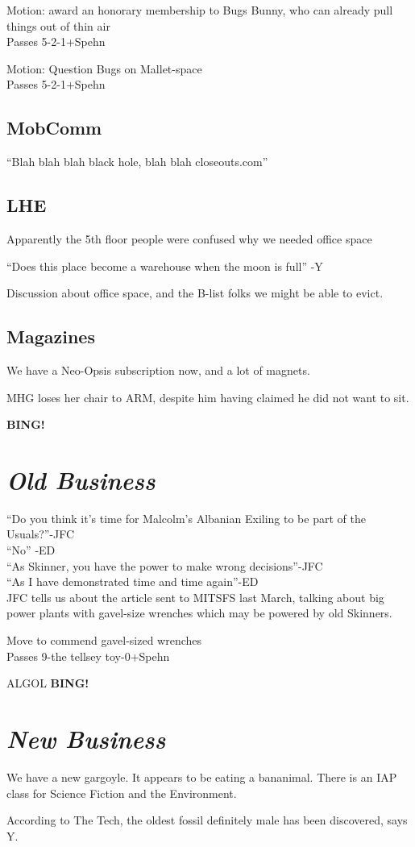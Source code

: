 \documentclass[10pt]{article}
\newcommand{\bing}{{\bf BING!} }
\newcommand{\goto}[1]{\bing \vskip 12pt \section*{{\em{#1}}}}
\begin{document}
Motion: award an honorary membership to Bugs Bunny, who can already
pull things out of thin air\\
Passes 5-2-1+Spehn

Motion: Question Bugs on Mallet-space\\
Passes 5-2-1+Spehn

\subsection*{MobComm}
``Blah blah blah black hole, blah blah closeouts.com''

\subsection*{LHE}
Apparently the 5th floor people were confused why we needed office space

``Does this place become a warehouse when the moon is full'' -Y

Discussion about office space, and the B-list folks we might be able
to evict.

\subsection*{Magazines}
We have a Neo-Opsis subscription now, and a lot of magnets.

MHG loses her chair to ARM, despite him having claimed he did not want
to sit.

\goto{Old Business}


``Do you think it's time for Malcolm's Albanian Exiling to be part of
the Usuals?''-JFC\\
``No'' -ED\\
``As Skinner, you have the power to make wrong decisions''-JFC\\
``As I have demonstrated time and time again''-ED\\

JFC tells us about the article sent to MITSFS last March, talking
about big power plants with gavel-size wrenches which may be powered
by old Skinners.

Move to commend gavel-sized wrenches\\
Passes 9-the tellsey toy-0+Spehn

ALGOL
\goto{New Business}
We have a new gargoyle. It appears to be eating a bananimal.
There is an IAP class for Science Fiction and the Environment.

According to The Tech, the oldest fossil definitely male has been
discovered, says Y.
\end{document}
